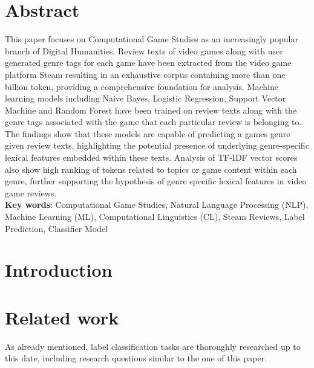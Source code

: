 \documentclass[11pt, a4paper]{article}
\begin{document}
\thispagestyle{empty}\clearpage

\section*{Abstract}
This paper focuses on Computational Game Studies as an increasingly popular branch of Digital Humanities. Review texts of video games along with user generated genre tags for each game have been extracted from the video game platform Steam resulting in an exhaustive corpus containing more than one billion token, providing a comprehensive foundation for analysis. Machine learning models including Naive Bayes, Logistic Regression, Support Vector Machine and Random Forest have been trained on review texts along with the genre tags associated with the game that each particular review is belonging to. The findings show that these models are capable of predicting a games genre given review texts, highlighting the potential presence of underlying genre-specific lexical features embedded within these texts. Analysis of TF-IDF vector scores also show high ranking of tokens related to topics or game content within each genre, further supporting the hypothesis of genre specific lexical features in video game reviews.\\

\noindent\textbf{Key words}: Computational Game Studies, Natural Language Processing (NLP), Machine Learning (ML), Computational Linguistics (CL), Steam Reviews, Label Prediction, Classifier Model
\clearpage


\clearpage
\tableofcontents\vspace{2\baselineskip}\clearpage
\listoftables\vspace{2\baselineskip}\clearpage
\listoffigures\clearpage

\clearpage\section{Introduction}


\section{Related work}
As already mentioned, label classification tasks are thoroughly researched up to this date, including research questions similar to the one of this paper.
\end{document}
